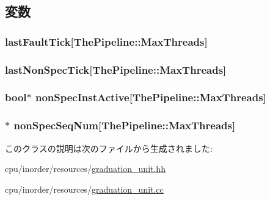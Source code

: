 \subsection{変数}
\hypertarget{classGraduationUnit_a06338b6a229a01ba08102d38224d0fbf}{
\subsubsection[{lastFaultTick}]{ {\bf lastFaultTick}\mbox{[}{\bf ThePipeline::MaxThreads}\mbox{]}}}
\label{classGraduationUnit_a06338b6a229a01ba08102d38224d0fbf}
\hypertarget{classGraduationUnit_a0ecb66fa77b766d3a2dcf951d7d592a2}{
\subsubsection[{lastNonSpecTick}]{ {\bf lastNonSpecTick}\mbox{[}{\bf ThePipeline::MaxThreads}\mbox{]}}}
\label{classGraduationUnit_a0ecb66fa77b766d3a2dcf951d7d592a2}
\hypertarget{classGraduationUnit_aa27d1c9b589af0c77a81c490021c7dcb}{
\subsubsection[{nonSpecInstActive}]{\setlength{\rightskip}{0pt plus 5cm}bool$\ast$ {\bf nonSpecInstActive}\mbox{[}{\bf ThePipeline::MaxThreads}\mbox{]}}}
\label{classGraduationUnit_aa27d1c9b589af0c77a81c490021c7dcb}
\hypertarget{classGraduationUnit_a899b1bc10d38a0f725495bf2108479a3}{
\subsubsection[{nonSpecSeqNum}]{$\ast$ {\bf nonSpecSeqNum}\mbox{[}{\bf ThePipeline::MaxThreads}\mbox{]}}}
\label{classGraduationUnit_a899b1bc10d38a0f725495bf2108479a3}


このクラスの説明は次のファイルから生成されました:\begin{DoxyCompactItemize}
\item 
cpu/inorder/resources/\hyperlink{graduation__unit_8hh}{graduation\_\-unit.hh}\item 
cpu/inorder/resources/\hyperlink{graduation__unit_8cc}{graduation\_\-unit.cc}\end{DoxyCompactItemize}

